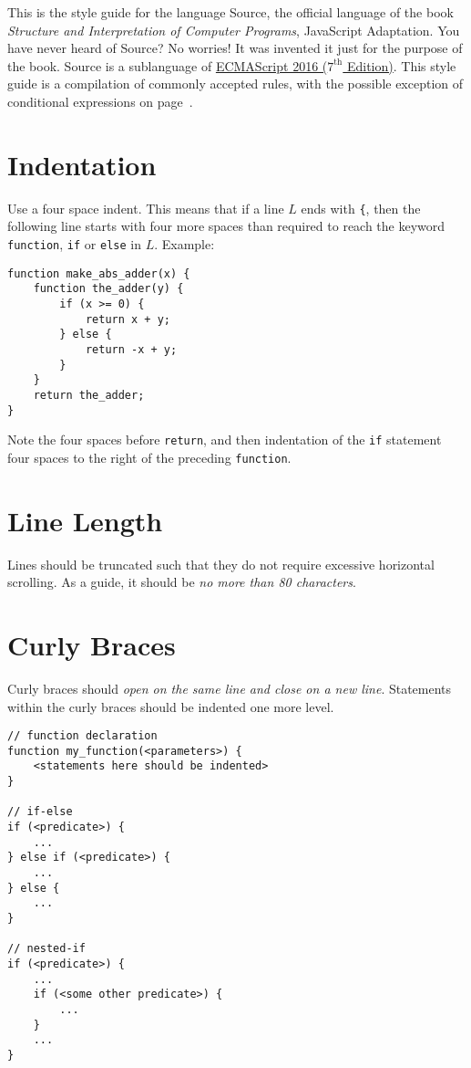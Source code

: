 



This is the style guide for the language Source,
the official language of the book \emph{Structure and Interpretation
of Computer Programs}, JavaScript Adaptation.
You have never heard of Source? No worries! It was invented
it just for the purpose of the book. Source is a sublanguage of 
\href{http://www.ecma-international.org/publications/files/ECMA-ST/Ecma-262.pdf}{
ECMAScript 2016 ($7^{\textrm{th}}$ Edition)}. This style guide is a compilation
of commonly accepted rules, with the possible exception of conditional expressions
on page~\pageref{condex}.
        
\section*{Indentation}
  Use a four space indent. This means that if a line $L$ ends with \verb#{#, then 
the following line starts with four more spaces than required to reach the keyword
\lstinline{function}, \lstinline{if} or \lstinline{else} in $L$.
Example:
\begin{lstlisting}
function make_abs_adder(x) {
    function the_adder(y) {
        if (x >= 0) {
            return x + y;
        } else {
            return -x + y;
        }
    }
    return the_adder;
}
\end{lstlisting}
Note the four spaces before \lstinline{return}, and then indentation of the \lstinline{if}
statement four spaces to the right of the preceding \lstinline{function}.

\section*{Line Length}
  Lines should be truncated such that they do not require excessive horizontal scrolling.
  As a guide, it should be \emph{no more than 80 characters}.
  
\section*{Curly Braces}
  Curly braces should \emph{open on the same line and close on a new line}.
  Statements within the curly braces should be indented one more level.

\begin{lstlisting}
// function declaration
function my_function(<parameters>) {
    <statements here should be indented>
}

// if-else
if (<predicate>) {
    ...
} else if (<predicate>) {
    ...
} else {
    ...
}

// nested-if
if (<predicate>) {
    ...
    if (<some other predicate>) {
        ...
    }
    ...
}
\end{lstlisting}

